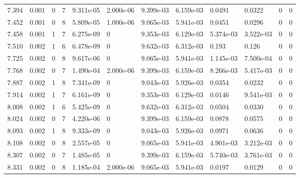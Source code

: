 \documentclass[preview]{standalone}
\begin{document}
{{{\begin{tabular}{L{1.2cm}C{1.2cm} C{0.3cm}C{0.5cm} C{1.4cm}C{1.4cm} C{1.4cm}C{1.4cm} C{1.6cm}C{1.6cm} C{1.6cm}C{1.6cm}}
  7.394  &  0.001  & 0     &  7 &  9.311e-05  & 2.000e-06  &  9.399e-03&   6.159e-03& 0.0491 & 0.0322   &  0 & 0  \\ 
  7.452  &  0.001  & 0     &  8 &  5.809e-05  & 1.000e-06  &  9.065e-03&   5.941e-03& 0.0451 & 0.0296   &  0 & 0  \\ 
  7.458  &  0.001  & 1     &  7 &  6.275e-09  & 0  &  9.353e-03&   6.129e-03& 5.374e-03 & 3.522e-03   &  0 & 0  \\ 
  7.510  &  0.002  & 1     &  6 &  6.478e-09  & 0  &  9.632e-03&   6.312e-03& 0.193 & 0.126   &  0 & 0  \\ 
  7.725  &  0.002  & 0     &  8 &  9.617e-06  & 0  &  9.065e-03&   5.941e-03& 1.145e-03 & 7.500e-04   &  0 & 0  \\ 
  7.768  &  0.002  & 0     &  7 &  1.490e-04  & 2.000e-06  &  9.399e-03&   6.159e-03& 8.266e-03 & 5.417e-03   &  0 & 0  \\ 
  7.887  &  0.002  & 1     &  8 &  7.341e-09  & 0  &  9.043e-03&   5.926e-03& 0.0354 & 0.0232   &  0 & 0  \\ 
  7.914  &  0.002  & 1     &  7 &  6.161e-09  & 0  &  9.353e-03&   6.129e-03& 0.0146 & 9.541e-03   &  0 & 0  \\ 
  8.008  &  0.002  & 1     &  6 &  5.425e-09  & 0  &  9.632e-03&   6.312e-03& 0.0504 & 0.0330   &  0 & 0  \\ 
  8.024  &  0.002  & 0     &  7 &  4.220e-06  & 0  &  9.399e-03&   6.159e-03& 0.0878 & 0.0575   &  0 & 0  \\ 
  8.093  &  0.002  & 1     &  8 &  9.333e-09  & 0  &  9.043e-03&   5.926e-03& 0.0971 & 0.0636   &  0 & 0  \\ 
  8.108  &  0.002  & 0     &  8 &  2.557e-05  & 0  &  9.065e-03&   5.941e-03& 4.901e-03 & 3.212e-03   &  0 & 0  \\ 
  8.307  &  0.002  & 0     &  7 &  1.485e-05  & 0  &  9.399e-03&   6.159e-03& 5.740e-03 & 3.761e-03   &  0 & 0  \\ 
  8.331  &  0.002  & 0     &  8 &  1.185e-04  & 2.000e-06  &  9.065e-03&   5.941e-03& 0.0197 & 0.0129   &  0 & 0  \\ 
\hline 
\end{tabular} 

}}}
\end{document}
